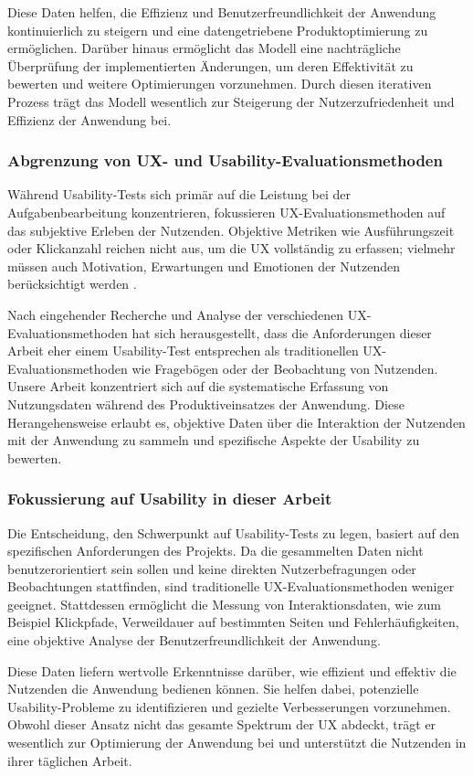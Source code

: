 \documentclass[12pt,oneside]{article}
\begin{document}
Diese Daten helfen, die Effizienz und Benutzerfreundlichkeit der Anwendung kontinuierlich zu steigern und eine datengetriebene Produktoptimierung zu ermöglichen. Darüber hinaus ermöglicht das Modell eine nachträgliche Überprüfung der implementierten Änderungen, um deren Effektivität zu bewerten und weitere Optimierungen vorzunehmen. Durch diesen iterativen Prozess trägt das Modell wesentlich zur Steigerung der Nutzerzufriedenheit und Effizienz der Anwendung bei.

\subsubsection{Abgrenzung von UX- und Usability-Evaluationsmethoden}
Während Usability-Tests sich primär auf die Leistung bei der Aufgabenbearbeitung konzentrieren, fokussieren UX-Evaluationsmethoden auf das subjektive Erleben der Nutzenden. Objektive Metriken wie Ausführungszeit oder Klickanzahl reichen nicht aus, um die UX vollständig zu erfassen; vielmehr müssen auch Motivation, Erwartungen und Emotionen der Nutzenden berücksichtigt werden \cite{dev}.

Nach eingehender Recherche und Analyse der verschiedenen UX-Evaluationsmethoden hat sich herausgestellt, dass die Anforderungen dieser Arbeit eher einem Usability-Test entsprechen als traditionellen UX-Evaluationsmethoden wie Fragebögen oder der Beobachtung von Nutzenden. Unsere Arbeit konzentriert sich auf die systematische Erfassung von Nutzungsdaten während des Produktiveinsatzes der Anwendung. Diese Herangehensweise erlaubt es, objektive Daten über die Interaktion der Nutzenden mit der Anwendung zu sammeln und spezifische Aspekte der Usability zu bewerten.
\subsubsection{Fokussierung auf Usability in dieser Arbeit}
Die Entscheidung, den Schwerpunkt auf Usability-Tests zu legen, basiert auf den spezifischen Anforderungen des Projekts. Da die gesammelten Daten nicht benutzerorientiert sein sollen und keine direkten Nutzerbefragungen oder Beobachtungen stattfinden, sind traditionelle UX-Evaluationsmethoden weniger geeignet. Stattdessen ermöglicht die Messung von Interaktionsdaten, wie zum Beispiel Klickpfade, Verweildauer auf bestimmten Seiten und Fehlerhäufigkeiten, eine objektive Analyse der Benutzerfreundlichkeit der Anwendung.


Diese Daten liefern wertvolle Erkenntnisse darüber, wie effizient und effektiv die Nutzenden die Anwendung bedienen können. Sie helfen dabei, potenzielle Usability-Probleme zu identifizieren und gezielte Verbesserungen vorzunehmen. Obwohl dieser Ansatz nicht das gesamte Spektrum der UX abdeckt, trägt er wesentlich zur Optimierung der Anwendung bei und unterstützt die Nutzenden in ihrer täglichen Arbeit.
\end{document}

